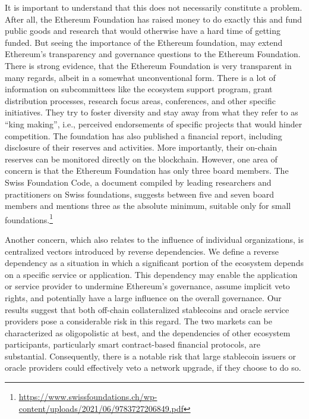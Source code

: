 \documentclass[No]{AEA}
\begin{document}
It is important to understand that this does not necessarily constitute a problem. After all, the Ethereum Foundation has raised money to do exactly this and fund public goods and research that would otherwise have a hard time of getting funded. 		
But seeing the importance of the Ethereum foundation, may extend Ethereum's transparency and governance questions to the Ethereum Foundation.
There is strong evidence, that the Ethereum Foundation is very transparent in many regards, albeit in a somewhat unconventional form. There is a lot of information on subcommittees like the ecosystem support program, grant distribution processes, research focus areas, conferences, and other specific initiatives. They try to foster diversity and stay away from what they refer to as ``king making'', i.e., perceived endorsements of specific projects that would hinder competition. 
The foundation has also published a financial report, including disclosure of their reserves and activities. More importantly, their on-chain reserves can be monitored directly on the blockchain. 
However, one area of concern is that the Ethereum Foundation has only three board members. The Swiss Foundation Code, a document compiled by leading researchers and practitioners on Swiss foundations, suggests between five and seven board members and mentions three as the absolute minimum, suitable only for small foundations.\footnote{\url{https://www.swissfoundations.ch/wp-content/uploads/2021/06/9783727206849.pdf}} 
 
Another concern, which also relates to the influence of individual organizations, is centralized vectors introduced by reverse dependencies. We define a reverse dependency as a situation in which a significant portion of the ecosystem depends on a specific service or application. This dependency may enable the application or service provider to undermine Ethereum's governance, assume implicit veto rights, and potentially have a large influence on the overall governance.
Our results suggest that both off-chain collateralized stablecoins and oracle service providers pose a considerable risk in this regard. The two markets can be characterized as oligopolistic at best, and the dependencies of other ecosystem participants, particularly smart contract-based financial protocols, are substantial. Consequently, there is a notable risk that large stablecoin issuers or oracle providers could effectively veto a network upgrade, if they choose to do so.
	
\end{document}

